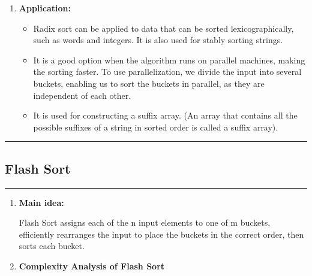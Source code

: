 \documentclass[11pt,a4paper]{article}
\begin{document}
{\begin{enumerate}[label=\textbf{\arabic*})]
\begin{table}[H]
\begin{tabular}{|p{8cm}|p{8cm}|}
							\hline
						\end{tabular}
					\end{table}
				\item \textbf{Application:}	
					\begin{itemize}
						\item Radix sort can be applied to data that can be sorted lexicographically, such as words and integers. It is also used for stably sorting strings. 
						\item It is a good option when the algorithm runs on parallel machines, making the sorting faster. To use parallelization, we divide the input into several buckets, enabling us to sort the buckets in parallel, as they are independent of each other. 
						\item It is used for constructing a suffix array. (An array that contains all the possible suffixes of a string in sorted order is called a suffix array).
					\end{itemize}
			\end{enumerate}
			
		\rule{15cm}{0.1cm}
		\subsection{Flash Sort}
		\rule{15cm}{0.1cm}
			\begin{enumerate}[label=\textbf{\arabic*})]
				\item \textbf{Main idea:}
				
					Flash Sort assigns each of the n input elements to one of m buckets, efficiently rearranges the input to place the buckets in the correct order, then sorts each bucket.
				\\[12pt]
				\item \textbf{Complexity Analysis of Flash Sort}
				

\end{enumerate}}
\end{document}
